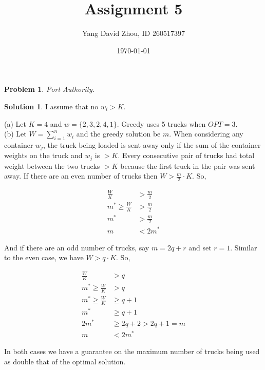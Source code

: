 \documentclass{article}
\newtheorem{problem}{Problem}
\theoremstyle{definition}
\newtheorem*{solution}{Solution}
\begin{document}
 \title{Assignment 5} 

\author{Yang David Zhou, ID 260517397} 

\date{\today}

\maketitle

\begin{problem} 

Port Authority.

\end{problem}

\begin{solution} I assume that no \(w_i>K\). 

(a) Let \(K=4\) and \(w=\{2,3,2,4,1\}\). Greedy uses 5 trucks when \(OPT=3\). \\

(b) Let \(W=\sum\limits_{i=1}^n w_i\) and the greedy solution be \(m\). When considering any container \(w_j\), the truck being loaded is sent away only if the sum of the container weights on the truck and \(w_j\) is \(>K\). Every consecutive pair of trucks had total weight between the two trucks \(>K\) because the first truck in the pair was sent away. If there are an even number of trucks then \(W>\frac{m}{2}\cdot K\). So,

\begin{align*} 
\frac{W}{K} &>  \frac{m}{2} \\ 
m^* \geq \frac{W}{K} &>  \frac{m}{2} \\
m^* &>  \frac{m}{2} \\
m &< 2m^*
\end{align*}

And if there are an odd number of trucks, say \(m=2q+r\) and set \(r=1\). Similar to the even case, we have \(W>q\cdot K\). So,

\begin{align*} 
\frac{W}{K} &>  q \\ 
m^* \geq  \frac{W}{K} &>  q \\
m^* \geq  \frac{W}{K} &\geq  q+1 \\
m^* &\geq  q+1 \\
2m^* &\geq 2q+2 >  2q+1 = m \\
m &<  2m^*
\end{align*}

In both cases we have a guarantee on the maximum number of trucks being used as double that of the optimal solution.

\end{solution}
\end{document}
